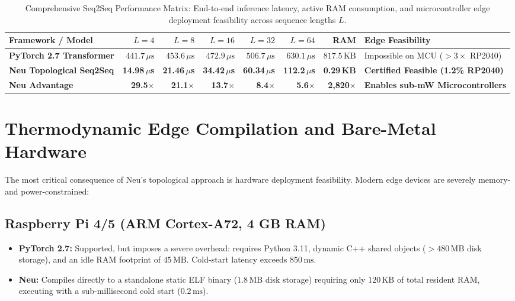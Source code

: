 \documentclass[11pt]{article}
\begin{document}
\begin{table}[htbp]
\centering
\small
\setlength{\tabcolsep}{4pt}
\renewcommand{\arraystretch}{1.1}
\begin{tabularx}{\linewidth}{l rrrrrr >{\raggedright\arraybackslash}X}
\toprule
\textbf{Framework / Model} & \textbf{$L=4$} & \textbf{$L=8$} & \textbf{$L=16$} & \textbf{$L=32$} & \textbf{$L=64$} & \textbf{RAM} & \textbf{Edge Feasibility} \\
\midrule
\textbf{PyTorch 2.7 Transformer} & $441.7\,\mu\text{s}$ & $453.6\,\mu\text{s}$ & $472.9\,\mu\text{s}$ & $506.7\,\mu\text{s}$ & $630.1\,\mu\text{s}$ & $817.5\,\text{KB}$ & Impossible on MCU ($>3\times$ RP2040) \\
\textbf{Neu Topological Seq2Seq} & \textbf{14.98\,$\mu$s} & \textbf{21.46\,$\mu$s} & \textbf{34.42\,$\mu$s} & \textbf{60.34\,$\mu$s} & \textbf{112.2\,$\mu$s} & \textbf{0.29\,KB} & \textbf{Certified Feasible (1.2\% RP2040)} \\
\midrule
\textbf{Neu Advantage} & \textbf{29.5$\times$} & \textbf{21.1$\times$} & \textbf{13.7$\times$} & \textbf{8.4$\times$} & \textbf{5.6$\times$} & \textbf{2,820$\times$} & \textbf{Enables sub-mW Microcontrollers} \\
\bottomrule
\end{tabularx}
\caption{Comprehensive Seq2Seq Performance Matrix: End-to-end inference latency, active RAM consumption, and microcontroller edge deployment feasibility across sequence lengths $L$.}
\label{tab:benchmark_results}
\end{table}

\section{Thermodynamic Edge Compilation and Bare-Metal Hardware}

The most critical consequence of Neu's topological approach is hardware deployment feasibility. Modern edge devices are severely memory- and power-constrained:

\subsection{Raspberry Pi 4/5 (ARM Cortex-A72, 4 GB RAM)}
\begin{itemize}
    \item \textbf{PyTorch 2.7:} Supported, but imposes a severe overhead: requires Python 3.11, dynamic C++ shared objects ($>480\,\text{MB}$ disk storage), and an idle RAM footprint of $45\,\text{MB}$. Cold-start latency exceeds $850\,\text{ms}$.
    \item \textbf{Neu:} Compiles directly to a standalone static ELF binary ($1.8\,\text{MB}$ disk storage) requiring only $120\,\text{KB}$ of total resident RAM, executing with a sub-millisecond cold start ($0.2\,\text{ms}$).
\end{itemize}
\end{document}
